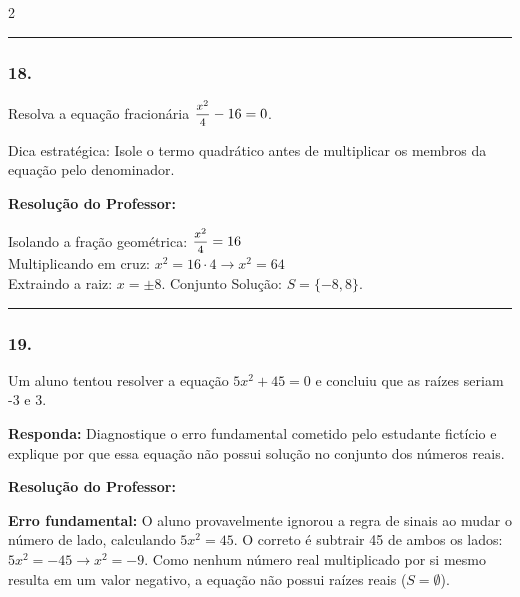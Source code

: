 \begin{multicols*}{2}
\par\vspace{\espacoQuestao}

\noindent\textcolor{CorLinha}{\rule{\linewidth}{0.5pt}} 
\par\vspace{\espacoPreQuestao}
\subsubsection*{18.} Resolva a equação fracionária $ \mfrac{x^2}{4} - 16 = 0 $. 
\begin{boxdica}
Dica estratégica: Isole o termo quadrático antes de multiplicar os membros da equação pelo denominador.
\end{boxdica}

\ifgabarito
    \begin{tcolorbox}[colback=CorTitUm!5, colframe=CorTitUm, boxrule=1pt, arc=4pt, left=6pt, right=6pt, top=6pt, bottom=6pt]
    \small\textbf{\textcolor{CorTitUm}{Resolução do Professor:}}\par\vspace{0.1cm}
    \color{CinzaEscuro}
    Isolando a fração geométrica: $\mfrac{x^2}{4} = 16$\\
    Multiplicando em cruz: $x^2 = 16 \cdot 4 \rightarrow x^2 = 64$\\
    Extraindo a raiz: $x = \pm 8$. Conjunto Solução: $S = \{-8, 8\}$.
    \end{tcolorbox}
\fi

\par\vspace{\espacoQuestao}

\noindent\textcolor{CorLinha}{\rule{\linewidth}{0.5pt}} 
\par\vspace{\espacoPreQuestao}
\subsubsection*{19.} Um aluno tentou resolver a equação $ 5x^2 + 45 = 0 $ e concluiu que as raízes seriam -3 e 3. 
\begin{boxresponda}
\textbf{Responda:} Diagnostique o erro fundamental cometido pelo estudante fictício e explique por que essa equação não possui solução no conjunto dos números reais.
\end{boxresponda}

\ifgabarito
    \begin{tcolorbox}[colback=CorTitUm!5, colframe=CorTitUm, boxrule=1pt, arc=4pt, left=6pt, right=6pt, top=6pt, bottom=6pt]
    \small\textbf{\textcolor{CorTitUm}{Resolução do Professor:}}\par\vspace{0.1cm}
    \color{CinzaEscuro}
    \textbf{Erro fundamental:} O aluno provavelmente ignorou a regra de sinais ao mudar o número de lado, calculando $5x^2 = 45$. O correto é subtrair 45 de ambos os lados: $5x^2 = -45 \rightarrow x^2 = -9$. Como nenhum número real multiplicado por si mesmo resulta em um valor negativo, a equação não possui raízes reais ($S = \emptyset$).
    \end{tcolorbox}
\fi


\end{multicols*}
